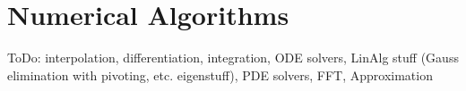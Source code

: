 \chapter{Numerical Algorithms}

ToDo: interpolation, differentiation, integration, ODE solvers, LinAlg stuff (Gauss elimination with pivoting, etc. eigenstuff), PDE solvers, FFT, Approximation